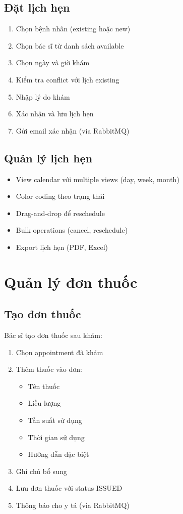 \documentclass[12pt,a4paper]{report}
\begin{document}
\subsection{Đặt lịch hẹn}
\begin{enumerate}
    \item Chọn bệnh nhân (existing hoặc new)
    \item Chọn bác sĩ từ danh sách available
    \item Chọn ngày và giờ khám
    \item Kiểm tra conflict với lịch existing
    \item Nhập lý do khám
    \item Xác nhận và lưu lịch hẹn
    \item Gửi email xác nhận (via RabbitMQ)
\end{enumerate}

\subsection{Quản lý lịch hẹn}
\begin{itemize}
    \item View calendar với multiple views (day, week, month)
    \item Color coding theo trạng thái
    \item Drag-and-drop để reschedule
    \item Bulk operations (cancel, reschedule)
    \item Export lịch hẹn (PDF, Excel)
\end{itemize}

\section{Quản lý đơn thuốc}

\subsection{Tạo đơn thuốc}
Bác sĩ tạo đơn thuốc sau khám:
\begin{enumerate}
    \item Chọn appointment đã khám
    \item Thêm thuốc vào đơn:
        \begin{itemize}
            \item Tên thuốc
            \item Liều lượng
            \item Tần suất sử dụng
            \item Thời gian sử dụng
            \item Hướng dẫn đặc biệt
        \end{itemize}
    \item Ghi chú bổ sung
    \item Lưu đơn thuốc với status ISSUED
    \item Thông báo cho y tá (via RabbitMQ)
\end{enumerate}
\end{document}
